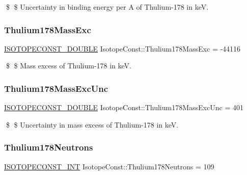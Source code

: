 \$ \$ Uncertainty in binding energy per A of Thulium-\/178 in keV. \mbox{\label{group___isotope_const-_thulium-_tm178_gab4b7542e3a0ae2d77e2cf0653442f3c9}} 
\subsubsection{\texorpdfstring{Thulium178\+Mass\+Exc}{Thulium178MassExc}}
{\footnotesize\ttfamily \mbox{\hyperlink{group___isotope_const-_macros_ga8f45a7272ce02c0b4c65c44636ed719a}{I\+S\+O\+T\+O\+P\+E\+C\+O\+N\+S\+T\+\_\+\+D\+O\+U\+B\+LE}} Isotope\+Const\+::\+Thulium178\+Mass\+Exc = -\/44116}

\$ \$ Mass excess of Thulium-\/178 in keV. \mbox{\label{group___isotope_const-_thulium-_tm178_gaa746a08041ee6ae7b8c398a7705f66d7}} 
\subsubsection{\texorpdfstring{Thulium178\+Mass\+Exc\+Unc}{Thulium178MassExcUnc}}
{\footnotesize\ttfamily \mbox{\hyperlink{group___isotope_const-_macros_ga8f45a7272ce02c0b4c65c44636ed719a}{I\+S\+O\+T\+O\+P\+E\+C\+O\+N\+S\+T\+\_\+\+D\+O\+U\+B\+LE}} Isotope\+Const\+::\+Thulium178\+Mass\+Exc\+Unc = 401}

\$ \$ Uncertainty in mass excess of Thulium-\/178 in keV. \mbox{\label{group___isotope_const-_thulium-_tm178_ga1d3287753b7d254131f3f01d28e648f8}} 
\subsubsection{\texorpdfstring{Thulium178\+Neutrons}{Thulium178Neutrons}}
{\footnotesize\ttfamily \mbox{\hyperlink{group___isotope_const-_macros_ga5f18360b3e99483a35c32d789e62621c}{I\+S\+O\+T\+O\+P\+E\+C\+O\+N\+S\+T\+\_\+\+I\+NT}} Isotope\+Const\+::\+Thulium178\+Neutrons = 109}

